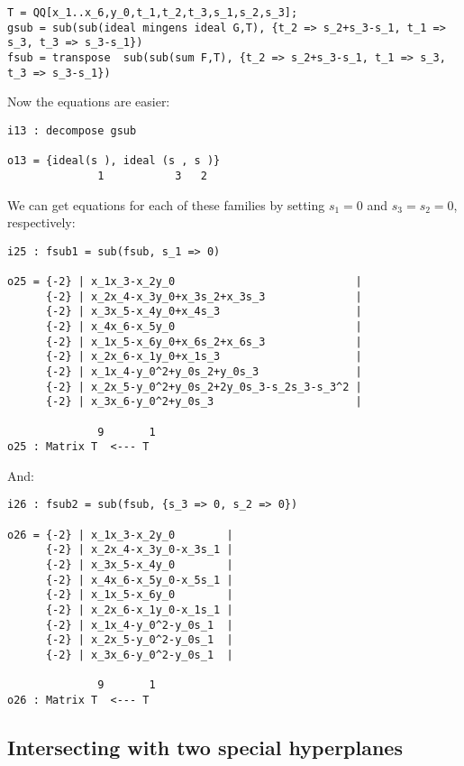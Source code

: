\documentclass[11pt, english]{article}
\begin{document}
\begin{lstlisting}
T = QQ[x_1..x_6,y_0,t_1,t_2,t_3,s_1,s_2,s_3];
gsub = sub(sub(ideal mingens ideal G,T), {t_2 => s_2+s_3-s_1, t_1 => s_3, t_3 => s_3-s_1})
fsub = transpose  sub(sub(sum F,T), {t_2 => s_2+s_3-s_1, t_1 => s_3, t_3 => s_3-s_1})
\end{lstlisting}

Now the equations are easier:

\begin{lstlisting}
i13 : decompose gsub

o13 = {ideal(s ), ideal (s , s )}
              1           3   2

\end{lstlisting}

We can get equations for each of these families by setting $s_1=0$ and $s_3=s_2=0$, respectively:
\begin{lstlisting}
i25 : fsub1 = sub(fsub, s_1 => 0)

o25 = {-2} | x_1x_3-x_2y_0                            |
      {-2} | x_2x_4-x_3y_0+x_3s_2+x_3s_3              |
      {-2} | x_3x_5-x_4y_0+x_4s_3                     |
      {-2} | x_4x_6-x_5y_0                            |
      {-2} | x_1x_5-x_6y_0+x_6s_2+x_6s_3              |
      {-2} | x_2x_6-x_1y_0+x_1s_3                     |
      {-2} | x_1x_4-y_0^2+y_0s_2+y_0s_3               |
      {-2} | x_2x_5-y_0^2+y_0s_2+2y_0s_3-s_2s_3-s_3^2 |
      {-2} | x_3x_6-y_0^2+y_0s_3                      |

              9       1
o25 : Matrix T  <--- T
\end{lstlisting}

And:

\begin{lstlisting}
i26 : fsub2 = sub(fsub, {s_3 => 0, s_2 => 0})

o26 = {-2} | x_1x_3-x_2y_0        |
      {-2} | x_2x_4-x_3y_0-x_3s_1 |
      {-2} | x_3x_5-x_4y_0        |
      {-2} | x_4x_6-x_5y_0-x_5s_1 |
      {-2} | x_1x_5-x_6y_0        |
      {-2} | x_2x_6-x_1y_0-x_1s_1 |
      {-2} | x_1x_4-y_0^2-y_0s_1  |
      {-2} | x_2x_5-y_0^2-y_0s_1  |
      {-2} | x_3x_6-y_0^2-y_0s_1  |

              9       1
o26 : Matrix T  <--- T
\end{lstlisting}

\subsection{Intersecting with two special hyperplanes}
\end{document}

